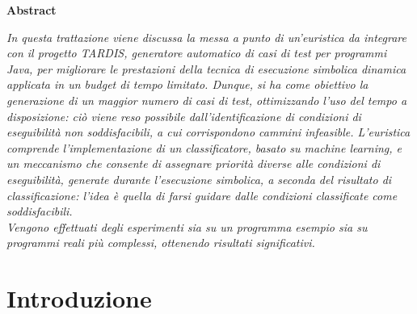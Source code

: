\documentclass[a4paper, 12pt, oneside]{book}
\theoremstyle{normal}
\begin{document}

\newpage
\thispagestyle{plain}
\begin{flushleft}
  \huge{\textbf{Abstract}}
\end{flushleft}
\vspace{1cm}
\textit{In questa trattazione viene discussa la messa a punto di un'euristica da integrare con il progetto TARDIS, generatore automatico di casi di test per programmi Java, per migliorare le prestazioni della tecnica di esecuzione simbolica dinamica applicata in un budget di tempo limitato. Dunque, si ha come obiettivo la generazione di un maggior numero di casi di test, ottimizzando l'uso del tempo a disposizione: ciò viene reso possibile dall'identificazione di condizioni di eseguibilità non soddisfacibili, a cui corrispondono cammini infeasible. L'euristica comprende l'implementazione di un classificatore, basato su machine learning, e un meccanismo che consente di assegnare priorità diverse alle condizioni di eseguibilità, generate durante l'esecuzione simbolica, a seconda del risultato di classificazione: l'idea è quella di farsi guidare dalle condizioni classificate come soddisfacibili. \\ Vengono effettuati degli esperimenti sia su un programma esempio sia su programmi reali più complessi, ottenendo risultati significativi.}

\tableofcontents



\chapter{Introduzione}
\end{document}
